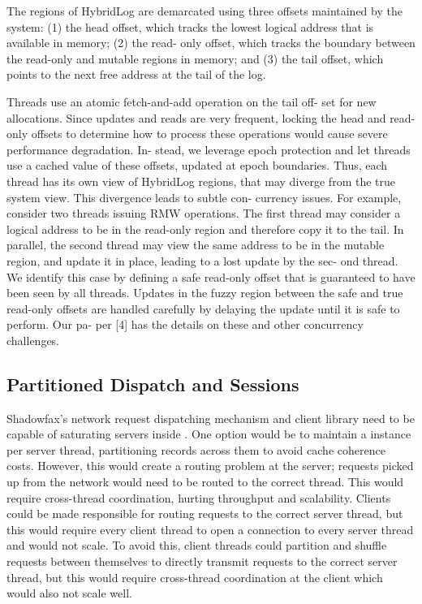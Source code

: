 {The regions of HybridLog are demarcated using three offsets maintained
by the system: (1) the head offset, which tracks the lowest logical
address that is available in memory; (2) the read- only offset, which
tracks the boundary between the read-only and mutable regions in memory;
and (3) the tail offset, which points to the next free address at the
tail of the log.

Threads use an atomic fetch-and-add operation on the tail off- set for
new allocations. Since updates and reads are very frequent, locking the
head and read-only offsets to determine how to process these operations
would cause severe performance degradation. In- stead, we leverage epoch
protection and let threads use a cached value of these offsets, updated
at epoch boundaries. Thus, each thread has its own view of HybridLog
regions, that may diverge from the true system view. This divergence
leads to subtle con- currency issues. For example, consider two threads
issuing RMW operations. The first thread may consider a logical address
to be in the read-only region and therefore copy it to the tail. In
parallel, the second thread may view the same address to be in the
mutable region, and update it in place, leading to a lost update by the
sec- ond thread. We identify this case by defining a safe read-only
offset that is guaranteed to have been seen by all threads. Updates in
the fuzzy region between the safe and true read-only offsets are handled
carefully by delaying the update until it is safe to perform. Our pa-
per [4] has the details on these and other concurrency challenges.
}
\fi

\subsection{Partitioned Dispatch and Sessions}
\label{sec:dispatch}

Shadowfax's network request dispatching mechanism and client library need to be
capable of saturating servers inside \faster.
%
One option would be to maintain a \faster instance per server thread,
partitioning records across them to avoid cache coherence costs.
%
However, this would create a routing problem at the server; requests
picked up from the network would need to be routed to the correct thread.
%
This would require cross-thread coordination, hurting throughput and
scalability.
%
Clients could be made responsible for routing requests to the correct
server thread, but this would require every client thread to open a
connection to every server thread and would not scale.
%
To avoid this, client threads could partition and shuffle requests between
themselves to directly transmit requests to the correct server thread, but this would
require cross-thread coordination at the client which would also not scale well.

